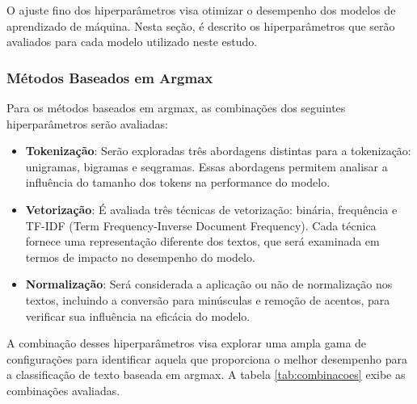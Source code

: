 O ajuste fino dos hiperparâmetros visa otimizar o desempenho dos modelos de aprendizado de máquina. Nesta seção, é descrito os hiperparâmetros que serão avaliados para cada modelo utilizado neste estudo.

\subsubsection{Métodos Baseados em Argmax}

Para os métodos baseados em argmax, as combinações dos seguintes hiperparâmetros serão avaliadas:

\begin{itemize}
    \item \textbf{Tokenização}: Serão exploradas três abordagens distintas para a tokenização: unigramas, bigramas e seqgramas. Essas abordagens permitem analisar a influência do tamanho dos tokens na performance do modelo.
    \item \textbf{Vetorização}: É avaliada três técnicas de vetorização: binária, frequência e TF-IDF (Term Frequency-Inverse Document Frequency). Cada técnica fornece uma representação diferente dos textos, que será examinada em termos de impacto no desempenho do modelo.
    \item \textbf{Normalização}: Será considerada a aplicação ou não de normalização nos textos, incluindo a conversão para minúsculas e remoção de acentos, para verificar sua influência na eficácia do modelo.
\end{itemize}

A combinação desses hiperparâmetros visa explorar uma ampla gama de configurações para identificar aquela que proporciona o melhor desempenho para a classificação de texto baseada em argmax. A tabela \ref{tab:combinacoes} exibe as combinações avaliadas.

